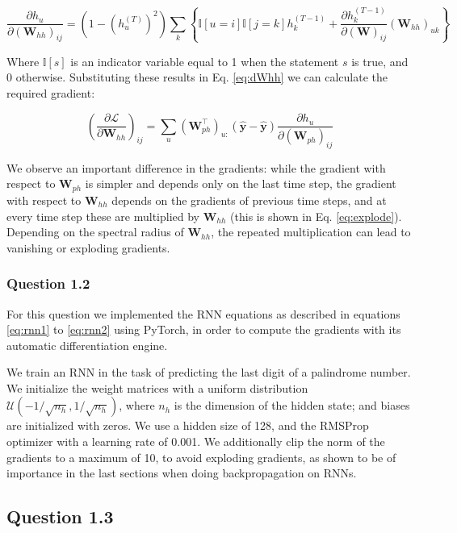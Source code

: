 \documentclass{article}
\newcommand{\pd}[2]{\frac{\partial #1}{\partial #2}}
\begin{document}
\begin{equation}
\pd{h_u}{(\mathbf{W}_{hh})_{ij}} =
(1 - (h_u^{(T)})^2) \sum_k\left\lbrace \mathbb{I}[u=i]\mathbb{I}[j=k]  h^{(T-1)}_k + \pd{h_k^{(T-1)}}{(\mathbf{W})_{ij}}(\mathbf{W}_{hh})_{uk}\right\rbrace
\label{eq:explode}
\end{equation}

Where $\mathbb{I}[s]$ is an indicator variable equal to 1 when the statement $s$ is true, and 0 otherwise. Substituting these results in Eq. \ref{eq:dWhh} we can calculate the required gradient:

\begin{equation}
\left(\pd{\mathcal{L}}{\mathbf{W}_{hh}}\right)_{ij} = \sum_u(\mathbf{W}_{ph}^\top)_{u:}(\hat{\mathbf{y}} - \hat{\mathbf{y}})\pd{h_u}{(\mathbf{W}_{ph})_{ij}}
\end{equation}

We observe an important difference in the gradients: while the gradient with respect to $\mathbf{W}_{ph}$ is simpler and depends only on the last time step, the gradient with respect to $\mathbf{W}_{hh}$ depends on the gradients of previous time steps, and at every time step these are multiplied by $\mathbf{W}_{hh}$ (this is shown in Eq. \ref{eq:explode}). Depending on the spectral radius of $\mathbf{W}_{hh}$, the repeated multiplication can lead to vanishing or exploding gradients.

\subsubsection*{Question 1.2}

For this question we implemented the RNN equations as described in equations \ref{eq:rnn1} to \ref{eq:rnn2} using PyTorch, in order to compute the gradients with its automatic differentiation engine. 

We train an RNN in the task of predicting the last digit of a palindrome number. We initialize the weight matrices with a uniform distribution $\mathcal{U}(-1/\sqrt{n_h}, 1/\sqrt{n_h})$, where $n_h$ is the dimension of the hidden state; and biases are initialized with zeros. We use a hidden size of 128, and the RMSProp optimizer with a learning rate of 0.001. We additionally clip the norm of the gradients to a maximum of 10, to avoid exploding gradients, as shown to be of importance in the last sections when doing backpropagation on RNNs.

\subsection*{Question 1.3}
\end{document}
